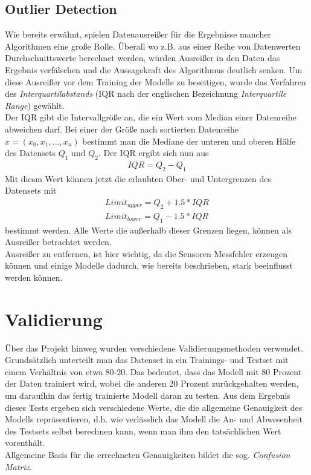 \subsection{Outlier Detection}
Wie bereits erwähnt, spielen Datenausreißer für die Ergebnisse mancher Algorithmen eine große Rolle. Überall 
wo z.B. aus einer Reihe von Datenwerten Durchschnittswerte berechnet werden, würden Ausreißer in den Daten das 
Ergebnis verfälschen und die Aussagekraft des Algorithmus deutlich senken.
Um diese Ausreißer vor dem Training der Modelle zu beseitigen, wurde das Verfahren des 
\textit{Interquartilabstands} (IQR nach der englischen Bezeichnung \textit{Interquartile Range}) gewählt.\\
Der IQR gibt die Intervallgröße an, die ein Wert vom Median einer Datenreihe abweichen darf. Bei einer 
der Größe nach sortierten Datenreihe $x = (x_0,x_1,...,x_n)$ bestimmt man die Mediane der unteren und oberen 
Hälfe des Datensets $Q_1$ und $Q_2$. Der IQR ergibt sich nun aus 
\begin{align}
    IQR = Q_2 - Q_1
\end{align}
Mit diesm Wert können jetzt die erlaubten Ober- und Untergrenzen 
des Datensets mit 
\begin{align}
    Limit_{upper} = Q_2 + 1.5 * IQR \\
    Limit_{lower} = Q_1 - 1.5 * IQR
\end{align} 
bestimmt werden. Alle Werte die außerhalb dieser Grenzen liegen, können als Ausreißer betrachtet werden.\\
Ausreißer zu entfernen, ist hier wichtig, da die Sensoren Messfehler erzeugen können und einige Modelle dadurch,
wie bereits beschrieben, stark beeinflusst werden können.

\section{Validierung}
\sloppy
Über das Projekt hinweg wurden verschiedene Validierungsmethoden verwendet. Grundsätzlich unterteilt man das 
Datenset in ein Trainings- und Testset mit einem Verhältnis von etwa 80-20. Das bedeutet, dass das Modell mit
80 Prozent der Daten trainiert wird, wobei die anderen 20 Prozent zurückgehalten werden, um daraufhin das 
fertig trainierte Modell daran zu testen. Aus dem Ergebnis dieses Tests ergeben sich verschiedene Werte, die  
die allgemeine Genauigkeit des Modells repräsentieren, d.h. wie verlässlich das Modell die An- und Abwesenheit 
des Testsets selbst berechnen kann, wenn man ihm den tatsächlichen Wert vorenthält.\\
Allgemeine Basis für die errechneten Genauigkeiten bildet die sog. \textit{Confusion Matrix}.

